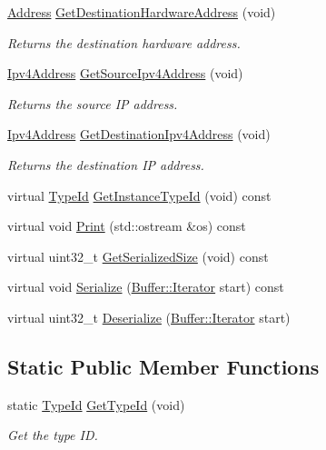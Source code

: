\begin{DoxyCompactItemize}
\hyperlink{classns3_1_1Address}{Address} \hyperlink{classns3_1_1ArpHeader_a91f9dd522b1c5758c4b6d8a629f1f1ce}{Get\+Destination\+Hardware\+Address} (void)
\begin{DoxyCompactList}\small\item\em Returns the destination hardware address. \end{DoxyCompactList}\item 
\hyperlink{classns3_1_1Ipv4Address}{Ipv4\+Address} \hyperlink{classns3_1_1ArpHeader_aca4df982ed497cd856d7b2ef6722687b}{Get\+Source\+Ipv4\+Address} (void)
\begin{DoxyCompactList}\small\item\em Returns the source IP address. \end{DoxyCompactList}\item 
\hyperlink{classns3_1_1Ipv4Address}{Ipv4\+Address} \hyperlink{classns3_1_1ArpHeader_a03c9a4823f0f9210f46b6971d18cb971}{Get\+Destination\+Ipv4\+Address} (void)
\begin{DoxyCompactList}\small\item\em Returns the destination IP address. \end{DoxyCompactList}\item 
virtual \hyperlink{classns3_1_1TypeId}{Type\+Id} \hyperlink{classns3_1_1ArpHeader_aa00de6e5d9a826ea6ded4ebcbe7fb711}{Get\+Instance\+Type\+Id} (void) const 
\item 
virtual void \hyperlink{classns3_1_1ArpHeader_aaddbf8596462e5b2c759eaf7d98b047c}{Print} (std\+::ostream \&os) const 
\item 
virtual uint32\+\_\+t \hyperlink{classns3_1_1ArpHeader_a49ef082e7372e63ed828561bf51da92e}{Get\+Serialized\+Size} (void) const 
\item 
virtual void \hyperlink{classns3_1_1ArpHeader_a277dfd6e5a0ee69a3bf612c1d21a5698}{Serialize} (\hyperlink{classns3_1_1Buffer_1_1Iterator}{Buffer\+::\+Iterator} start) const 
\item 
virtual uint32\+\_\+t \hyperlink{classns3_1_1ArpHeader_ac4ac02b6ff4125d41dfe52593f23718d}{Deserialize} (\hyperlink{classns3_1_1Buffer_1_1Iterator}{Buffer\+::\+Iterator} start)
\end{DoxyCompactItemize}
\subsection*{Static Public Member Functions}
\begin{DoxyCompactItemize}
\item 
static \hyperlink{classns3_1_1TypeId}{Type\+Id} \hyperlink{classns3_1_1ArpHeader_ab1cc11932150a66eb600cec9aef04d7c}{Get\+Type\+Id} (void)
\begin{DoxyCompactList}\small\item\em Get the type ID. \end{DoxyCompactList}\end{DoxyCompactItemize}
